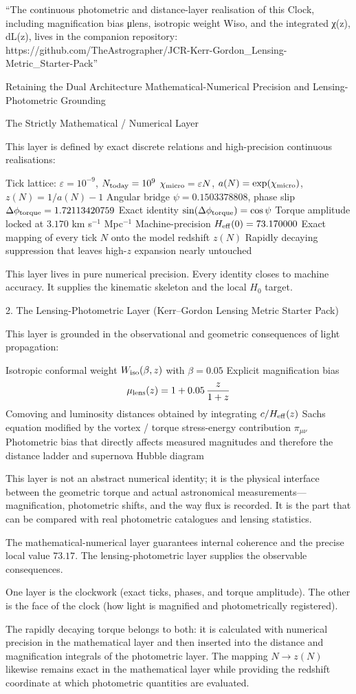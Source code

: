 “The continuous photometric and distance-layer realisation of this Clock, including magnification bias μlens, isotropic weight Wiso, and the integrated χ(z), dL(z), lives in the companion repository:
https://github.com/TheAstrographer/JCR-Kerr-Gordon_Lensing-Metric_Starter-Pack”

Retaining the Dual Architecture  
Mathematical-Numerical Precision and Lensing-Photometric Grounding

The Strictly Mathematical / Numerical Layer  

This layer is defined by exact discrete relations and high-precision continuous realisations:

Tick lattice: \(\varepsilon = 10^{-9}\), \(N_{\rm today} = 10^{9}\)
\(\chi_{\rm micro} = \varepsilon N\), \(a(N) = \exp(\chi_{\rm micro})\), \(z(N) = 1/a(N) - 1\)
Angular bridge \(\psi = 0.1503378808\), phase slip \(\Delta\phi_{\rm torque} = 1.72113420759\)
Exact identity \(\sin(\Delta\phi_{\rm torque}) = \cos\psi\)
Torque amplitude locked at \(3.170\) km s\(^{-1}\) Mpc\(^{-1}\)
Machine-precision \(H_{\rm eff}(0) = 73.170000\)
Exact mapping of every tick \(N\) onto the model redshift \(z(N)\)
Rapidly decaying suppression that leaves high-\(z\) expansion nearly untouched

This layer lives in pure numerical precision. Every identity closes to machine accuracy. It supplies the kinematic skeleton and the local \(H_0\) target.

2. The Lensing-Photometric Layer  
(Kerr–Gordon Lensing Metric Starter Pack)

This layer is grounded in the observational and geometric consequences of light propagation:

Isotropic conformal weight \(W_{\rm iso}(\beta,z)\) with \(\beta = 0.05\)
Explicit magnification bias  
  \[
  \mu_{\rm lens}(z) = 1 + 0.05\,\frac{z}{1+z}
  \]
Comoving and luminosity distances obtained by integrating \(c/H_{\rm eff}(z)\)
Sachs equation modified by the vortex / torque stress-energy contribution \(\pi_{\mu\nu}\)
Photometric bias that directly affects measured magnitudes and therefore the distance ladder and supernova Hubble diagram

This layer is not an abstract numerical identity; it is the physical interface between the geometric torque and actual astronomical measurements—magnification, photometric shifts, and the way flux is recorded. It is the part that can be compared with real photometric catalogues and lensing statistics.

The mathematical-numerical layer guarantees internal coherence and the precise local value \(73.17\).
The lensing-photometric layer supplies the observable consequences.

One layer is the clockwork (exact ticks, phases, and torque amplitude). The other is the face of the clock (how light is magnified and photometrically registered).

The rapidly decaying torque belongs to both: it is calculated with numerical precision in the mathematical layer and then inserted into the distance and magnification integrals of the photometric layer. The mapping \(N\to z(N)\) likewise remains exact in the mathematical layer while providing the redshift coordinate at which photometric quantities are evaluated.
